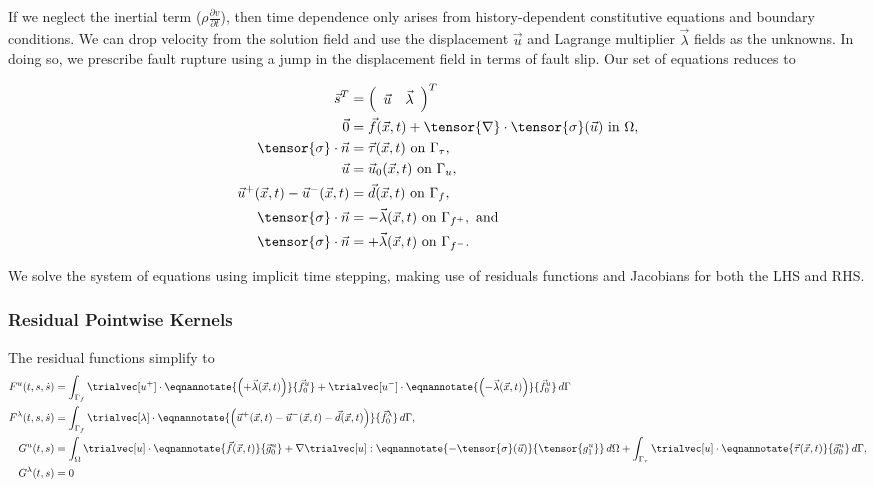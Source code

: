 If we neglect the inertial term
($\rho \frac{\partial v}{\partial t}$), then time dependence only
arises from history-dependent constitutive equations and boundary
conditions. We can drop velocity from the solution field and use the
displacement $\vec{u}$ and Lagrange multiplier $\vec{\lambda}$ fields
as the unknowns. In doing so, we prescribe fault rupture using a jump
in the displacement field in terms of fault slip. Our set of equations reduces to

\begin{align}
  \vec{s}^T &= \left( \begin{array}{cc} \vec{u} & \vec{\lambda} \end{array} \right)^T \\
  \vec{0} &= \vec{f}(\vec{x},t) + \tensor{\nabla} \cdot \tensor{\sigma}(\vec{u}) \text{ in } \Omega, \\
  \tensor{\sigma} \cdot \vec{n} &= \vec{\tau}(\vec{x},t) \text{ on } \Gamma_\tau, \\
  \vec{u} &= \vec{u}_0(\vec{x},t) \text{ on } \Gamma_u, \\
  \vec{u}^+(\vec{x},t) - \vec{u}^-(\vec{x},t) &= \vec{d}(\vec{x},t) \text{ on } \Gamma_f, \\
  \tensor{\sigma} \cdot \vec{n} &= -\vec{\lambda}(\vec{x},t) \text{ on }\Gamma_{f^+}, \text{ and} \\
  \tensor{\sigma} \cdot \vec{n} &= +\vec{\lambda}(\vec{x},t) \text{ on }\Gamma_{f^-}.
\end{align}

We solve the system of equations using implicit time stepping, making
use of residuals functions and Jacobians for both the LHS and RHS.

\subsubsection{Residual Pointwise Kernels}

The residual functions simplify to
\begin{align}
  F^u(t,s,\dot{s}) &= \int_{\Gamma_{f}} \trialvec[u^+] \cdot \eqnannotate{\left(+\vec{\lambda}(\vec{x},t)\right)}{\vec{f}^u_0}
                     + \trialvec[u^-] \cdot \eqnannotate{\left(-\vec{\lambda}(\vec{x},t)\right)}{\vec{f}^u_0}\, d\Gamma \\
  F^\lambda(t,s,\dot{s}) &= \int_{\Gamma_{f}} \trialvec[\lambda] \cdot \eqnannotate{\left(
    \vec{u}^+(\vec{x},t) - \vec{u}^-(\vec{x},t) - \vec{d}(\vec{x},t) \right)}{\vec{f}^\lambda_0} \, d\Gamma, \\
  G^u(t,s) &=  \int_\Omega \trialvec[u] \cdot \eqnannotate{\vec{f}(\vec{x},t)}{\vec{g}^u_0} + \nabla \trialvec[u] : \eqnannotate{-\tensor{\sigma}(\vec{u})}{\tensor{g^u_1}} \, d\Omega
  + \int_{\Gamma_\tau} \trialvec[u] \cdot \eqnannotate{\vec{\tau}(\vec{x},t)}{\vec{g}^u_0} \, d\Gamma, \\
  G^\lambda(t,s) &= 0
\end{align}

